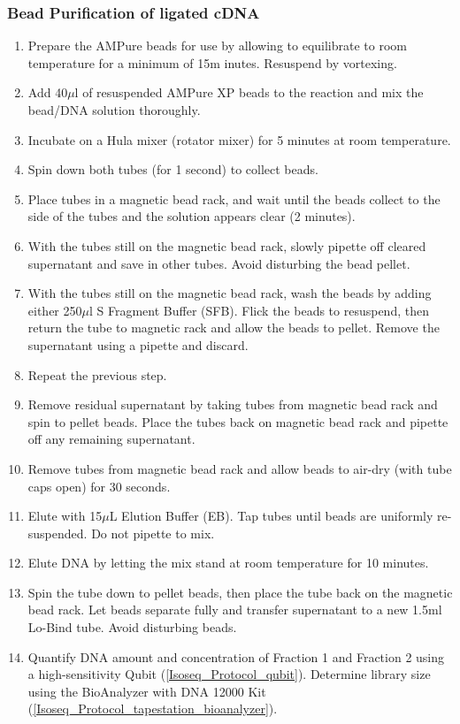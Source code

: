 \subsubsection{Bead Purification of ligated cDNA}
\begin{enumerate}
	\item Prepare the AMPure beads for use by allowing to equilibrate to room temperature for a minimum of 15m inutes. Resuspend by vortexing.
	\item Add 40$\mu$l of resuspended AMPure XP beads to the reaction and mix the bead/DNA solution thoroughly.
	\item Incubate on a Hula mixer (rotator mixer) for 5 minutes at room temperature.
	\item Spin down both tubes (for 1 second) to collect beads.
	\item Place tubes in a magnetic bead rack, and wait until the beads collect to the side of the tubes and the solution appears clear (2 minutes).
	\item With the tubes still on the magnetic bead rack, slowly pipette off cleared supernatant and save in other tubes. Avoid disturbing the bead pellet.
	\item With the tubes still on the magnetic bead rack, wash the beads by adding either 250$\mu$l S Fragment Buffer (SFB). Flick the beads to resuspend, then return the tube to magnetic rack and allow the beads to pellet. Remove the supernatant using a pipette and discard.
	\item Repeat the previous step.
	\item Remove residual supernatant by taking tubes from magnetic bead rack and spin to pellet beads. Place the tubes back on magnetic bead rack and pipette off any remaining supernatant. 
	\item Remove tubes from magnetic bead rack and allow beads to air-dry (with tube caps open) for 30 seconds.
	\item Elute with 15$\mu$L Elution Buffer (EB). Tap tubes until beads are uniformly re-suspended. Do not pipette to mix.
	\item Elute DNA by letting the mix stand at room temperature for 10 minutes.
	\item Spin the tube down to pellet beads, then place the tube back on the magnetic bead rack. Let beads separate fully and transfer supernatant to a new 1.5ml Lo-Bind tube. Avoid disturbing beads.
	\item Quantify DNA amount and concentration of Fraction 1 and Fraction 2 using a high-sensitivity Qubit (\cref{Isoseq_Protocol_qubit}). Determine library size using the BioAnalyzer with DNA 12000 Kit (\cref{Isoseq_Protocol_tapestation_bioanalyzer}). 
\end{enumerate}

